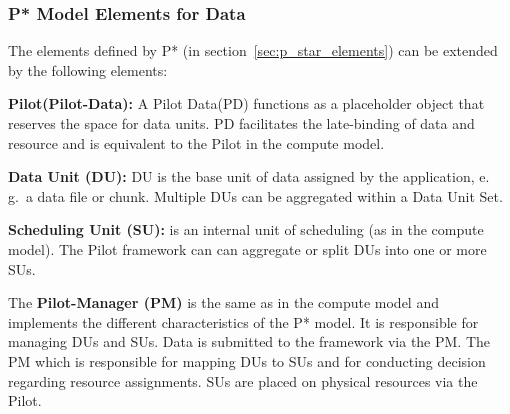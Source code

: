 \documentclass[conference,final]{IEEEtran}
\newcommand{\jhanote}[1]{ {\textcolor{red} { ***shantenu: #1 }}}
\newcommand{\alnote}[1]{ {\textcolor{blue} { ***andrel: #1 }}}
\newcommand{\alnote}[1]{}
\newcommand{\jhanote}[1]{}
\newcommand{\pilot}{Pilot\xspace}
\newcommand{\dus}{DUs\xspace}
\newcommand{\pilotdata}{Pilot Data\xspace}
\newcommand{\pd}{PD\xspace}
\newcommand{\sus}{SUs\xspace}
\begin{document}

\subsubsection*{P* Model Elements for Data}


The elements defined by P* (in section~\ref{sec:p_star_elements}) can
be extended by the following elements:

\begin{compactenum}[A.]

\item \textbf{\pilot (Pilot-Data):} A \pilotdata (\pd) functions as a 
	placeholder object that reserves the space
	for data units. PD facilitates the late-binding of data and resource and is
	equivalent to the \pilot in the compute model.

\item \textbf{Data Unit (DU):} DU is the base unit of data assigned by
  the application,  e.\,g.\ a data file or chunk. Multiple DUs can be aggregated 
   within a Data Unit Set.


\item \textbf{Scheduling Unit (SU):} is an internal unit of scheduling (as in 
the compute model). The Pilot framework can can aggregate or split DUs into one 
or more SUs.

\item The \textbf{Pilot-Manager (PM)} is the same as in the compute model and
implements the different characteristics of the P* model. It is responsible for
managing \dus and \sus. Data is submitted to the framework via the PM. The PM
which is responsible for mapping \dus to \sus and for conducting decision 
regarding resource assignments. \sus are placed on physical resources via the \pilot.
	
\end{compactenum}
 
\end{document}
